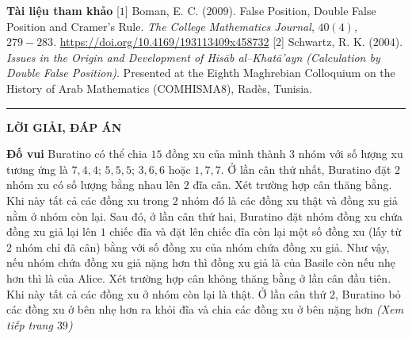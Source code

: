 \begin{multicols}{2}
	\vskip 0.1cm
	\textbf{\color{diendantoanhoc}Tài liệu tham khảo}
	\vskip 0.1cm
	[$1$] Boman, E. C. ($2009$). False Position, Double False Position and Cramer's Rule. \textit{The College Mathematics Journal}, $40(4)$, $279-283$. \url{https://doi.org/10.4169/193113409x458732}
	\vskip 0.1cm
	[$2$] Schwartz, R. K. ($2004$). \textit{Issues in the Origin and Development of Hisāb al--Khatā'ayn (Calculation by Double False Position)}. Presented at the Eighth Maghrebian Colloquium on the History of Arab Mathematics (COMHISMA$8$), Radès, Tunisia.
\end{multicols}
\vspace*{-10pt}
{\color{diendantoanhoc}\rule{1\linewidth}{1pt}}
\vskip 0.2cm
\centerline{\Large{\textbf{\color{diendantoanhoc}LỜI GIẢI, ĐÁP ÁN}}}
\vskip 0.1cm
\begin{multicols}{2}
	\textbf{\color{diendantoanhoc}Đố vui}
	\vskip 0.1cm
	Buratino có thể chia $15$ đồng xu của mình thành $3$ nhóm với số lượng xu tương ứng là $7, 4,4$;  $5, 5, 5$; $3, 6, 6$ hoặc $1, 7, 7$.
	\vskip 0.1cm
	Ở lần cân thứ nhất, Buratino đặt $2$ nhóm xu có số lượng bằng nhau lên $2$ đĩa cân. Xét trường hợp cân thăng bằng. Khi này tất cả các đồng xu trong $2$ nhóm đó là các đồng xu thật và đồng xu giả nằm ở nhóm còn lại. Sau đó, ở lần cân thứ hai, Buratino đặt nhóm đồng xu chứa đồng xu giả lại lên $1$ chiếc đĩa và đặt lên chiếc đĩa còn lại một số đồng xu (lấy từ $2$ nhóm chỉ đã cân) bằng với số đồng xu của nhóm chứa đồng xu giả. Như vậy, nếu nhóm chứa đồng xu giả nặng hơn thì đồng xu giả là của Basile còn nếu nhẹ hơn thì là của Alice. Xét trường hợp cân không thăng bằng ở lần cân đầu tiên. Khi này tất cả các đồng xu ở nhóm còn lại là thật. Ở lần cân thứ $2$, Buratino bỏ các đồng xu ở bên nhẹ hơn ra khỏi đĩa và chia các đồng xu ở bên nặng hơn
	\vskip 0.1cm
	\hfill \textit{(Xem tiếp trang $39$)}
\end{multicols}